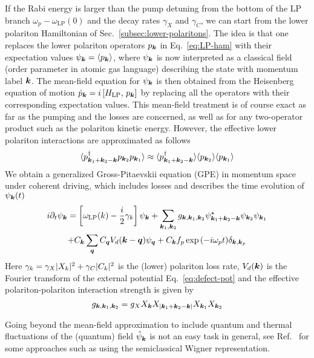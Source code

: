 If the Rabi energy is larger than the pump detuning from the bottom of
the LP branch $\omega_p - \omega_{\text{LP}}(0)$ and the decay rates
$\gamma_X$ and $\gamma_C$, we can start from the lower polariton
Hamiltonian of Sec.~\ref{subsec:lower-polaritons}.  The idea is that
one replaces the lower polariton operators $p_{\bm{k}}$ in
Eq.~\eqref{eq:LP-ham} with their expectation values
$\psi_{\bm{k}} = \langle p_{\bm{k}} \rangle$, where $\psi_{\bm{k}}$ is now
interpreted as a classical field (order parameter in atomic gas
language) describing the state with momentum label $\bm{k}$. The
mean-field equation for $\psi_{\bm{k}}$ is then obtained from the
Heisenberg equation of motion
$\dot{p}_{\bm{k}} =i \left[ H_{\text{LP}},\, p_{\bm{k}} \right]$ by
replacing all the operators with their corresponding expectation
values. This mean-field treatment is of course exact as far as the
pumping and the losses are concerned, as well as for any two-operator
product such as the polariton kinetic energy. However, the effective
lower polariton interactions are approximated as follows
%
\begin{equation}\label{eq:mean-field-approx}
  \langle p^{\dagger}_{\bm{k}_1 + \bm{k}_2 - \bm{k}} p_{\bm{k}_2} p_{\bm{k}_1} \rangle \approx \langle p^{\dagger}_{\bm{k}_1 + \bm{k}_2 - \bm{k}} \rangle \langle p_{\bm{k}_2} \rangle \langle p_{\bm{k}_1} \rangle
\end{equation}
% 
We obtain a generalized Gross-Pitaevskii equation (GPE) in momentum
space under coherent driving, which includes losses and describes the
time evolution of $\psi_{\bm{k}}(t)$
%
\begin{multline}\label{eq:mom-GPE}
  i\partial_t\psi_{\bm{k}} = \left[\omega_{\text{LP}}(k) - \frac{i}{2} \gamma_k\right]\psi_{\bm{k}} + \sum_{\bm{k}_1,\bm{k}_2} g_{\bm{k},\bm{k}_1,\bm{k}_2} \psi^{\star}_{\bm{k}_1 + \bm{k}_2 - \bm{k}} \psi_{\bm{k}_2} \psi_{\bm{k}_1}\\
  + C_{\bm{k}} \sum_{\bm{q}} C_{\bm{q}} V_d(\bm{k} - \bm{q}) \psi_{\bm{q}}
  + C_{\bm{k}} f_p \exp{\left(-i \omega_pt\right)} \delta_{\bm{k},\bm{k}_{p}}
\end{multline}
Here $\gamma_k = \gamma_X \vert X_k \vert^2 + \gamma_C \vert C_k \vert^2$ is the
(lower) polariton loss rate, $V_d(\bm{k})$ is the Fourier transform of
the external potential Eq.~\eqref{eq:defect-pot} and the effective
polariton-polariton interaction strength is given by
%
\begin{equation}\label{eq:LP-inter}
  g_{\bm{k},\bm{k}_1,\bm{k}_2} = g_X X_{\bm{k}}X_{\vert\bm{k}_1 + \bm{k}_2 - \bm{k}\vert}X_{\bm{k}_1}X_{\bm{k}_2}
\end{equation}

Going beyond the mean-field approximation to include quantum and
thermal fluctuations of the (quantum) field $\hat{\psi}_{\bm{k}}$ is not
an easy task in general, see Ref.~\cite{Carusotto_2013} for some
approaches such as using the semiclassical Wigner representation.


